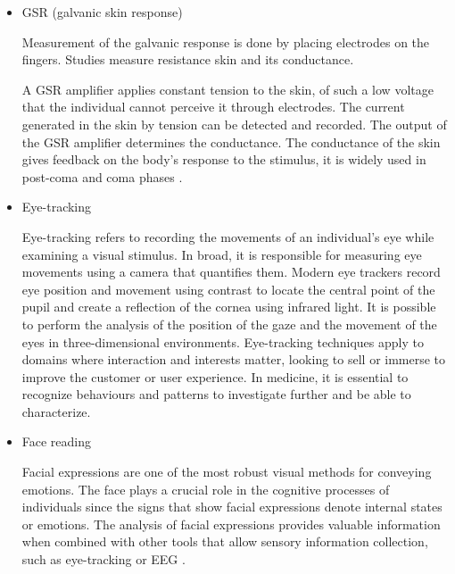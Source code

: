 \begin{itemize}
 
\item  GSR (galvanic skin response)

Measurement of the galvanic response is done by placing
electrodes on the fingers. Studies measure resistance
skin and its conductance.

A GSR amplifier applies constant tension to the skin,
of such a low voltage that the individual cannot
perceive it through electrodes. The current generated in the
skin by tension can be detected and recorded. The output of the GSR amplifier determines the conductance.
The conductance of the skin gives feedback on the body's response to the stimulus, it is widely used in post-coma and coma phases
\cite{Altntop2021,Luaute2018}.



\item  Eye-tracking

 Eye-tracking refers to recording the movements of an individual's eye while examining a visual stimulus. In broad, it is responsible for measuring eye movements using a camera that quantifies them. Modern eye trackers record eye position and movement using contrast to locate the central point of the pupil and create a reflection of the cornea using infrared light. It is possible to perform the analysis of the position of the gaze and the movement of the eyes in three-dimensional environments.
Eye-tracking techniques apply to domains where interaction and interests matter,
looking to sell or immerse to improve the customer or user experience. In medicine, it is essential to recognize behaviours and patterns to investigate further and be able to characterize\cite{Ting2014}.


\item  Face reading

 Facial expressions are one of the most robust  visual methods for conveying emotions. The face plays a crucial role in the cognitive processes of individuals since the signs that show facial expressions denote internal states or emotions. The analysis of facial expressions provides valuable information when combined with other tools that allow sensory information collection, such as eye-tracking or EEG .

\end{itemize}


\espaco




